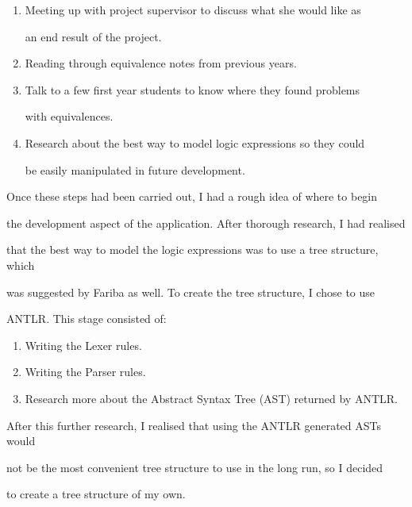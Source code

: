 \documentclass[12pt]{article}
\begin{document}
\begin{enumerate}

	\item Meeting up with project supervisor to discuss what she would like as

				an end result of the project.

	\item Reading through equivalence notes from previous years.

	\item Talk to a few first year students to know where they found problems

				with equivalences.

	\item Research about the best way to model logic expressions so they could

				be easily manipulated in future development.

\end{enumerate}



Once these steps had been carried out, I had a rough idea of where to begin 

the development aspect of the application. After thorough research, I had realised

that the best way to model the logic expressions was to use a tree structure, which

was suggested by Fariba as well. To create the tree structure, I chose to use

ANTLR. This stage consisted of:

\begin{enumerate}

	\item Writing the Lexer rules.

	\item Writing the Parser rules.

	\item Research more about the Abstract Syntax Tree (AST) returned by ANTLR.

\end{enumerate}



After this further research, I realised that using the ANTLR generated ASTs would

not be the most convenient tree structure to use in the long run, so I decided

to create a tree structure of my own.
\end{document}
